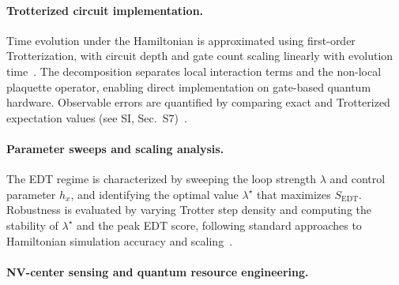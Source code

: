 \documentclass[twocolumn,10pt]{article}
\begin{document}


\paragraph*{Trotterized circuit implementation.}

Time evolution under the Hamiltonian is approximated using first-order Trotterization, with circuit depth and gate count scaling linearly with evolution time~\cite{Trotter1959,Suzuki1990,Lloyd1996,Childs2019}. The decomposition separates local interaction terms and the non-local plaquette operator, enabling direct implementation on gate-based quantum hardware. Observable errors are quantified by comparing exact and Trotterized expectation values (see SI, Sec.~S7)~\cite{BerryAhokasCleveSanders2007}.

\paragraph*{Parameter sweeps and scaling analysis.}

The EDT regime is characterized by sweeping the loop strength $\lambda$ and control parameter $h_x$, and identifying the optimal value $\lambda^\star$ that maximizes $S_{\mathrm{EDT}}$. Robustness is evaluated by varying Trotter step density and computing the stability of $\lambda^\star$ and the peak EDT score, following standard approaches to Hamiltonian simulation accuracy and scaling~\cite{Childs2019}.

\paragraph*{NV-center sensing and quantum resource engineering.}
\end{document}
